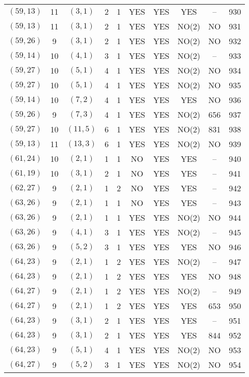 \begin{longtable}{|c|c|c|c|c|c|c|c|c|c|}
$(59, 13)$ & 11 & $(3, 1)$ & 2 & 1 & YES & YES & YES & -- & 930\\
$(59, 13)$ & 11 & $(3, 1)$ & 2 & 1 & YES & YES & NO(2) & NO & 931\\
$(59, 26)$ & 9 & $(3, 1)$ & 2 & 1 & YES & YES & NO(2) & NO & 932\\
$(59, 14)$ & 10 & $(4, 1)$ & 3 & 1 & YES & YES & NO(2) & -- & 933\\
$(59, 27)$ & 10 & $(5, 1)$ & 4 & 1 & YES & YES & NO(2) & NO & 934\\
$(59, 27)$ & 10 & $(5, 1)$ & 4 & 1 & YES & YES & NO(2) & NO & 935\\
$(59, 14)$ & 10 & $(7, 2)$ & 4 & 1 & YES & YES & YES & NO & 936\\
$(59, 26)$ & 9 & $(7, 3)$ & 4 & 1 & YES & YES & NO(2) & 656 & 937\\
$(59, 27)$ & 10 & $(11, 5)$ & 6 & 1 & YES & YES & NO(2) & 831 & 938\\
$(59, 13)$ & 11 & $(13, 3)$ & 6 & 1 & YES & YES & NO(2) & NO & 939\\
$(61, 24)$ & 10 & $(2, 1)$ & 1 & 1 & NO & YES & YES & -- & 940\\
$(61, 19)$ & 10 & $(3, 1)$ & 2 & 1 & NO & YES & YES & -- & 941\\
$(62, 27)$ & 9 & $(2, 1)$ & 1 & 2 & NO & YES & YES & -- & 942\\
$(63, 26)$ & 9 & $(2, 1)$ & 1 & 1 & NO & YES & YES & -- & 943\\
$(63, 26)$ & 9 & $(2, 1)$ & 1 & 1 & YES & YES & NO(2) & NO & 944\\
$(63, 26)$ & 9 & $(4, 1)$ & 3 & 1 & YES & YES & NO(2) & -- & 945\\
$(63, 26)$ & 9 & $(5, 2)$ & 3 & 1 & YES & YES & YES & NO & 946\\
$(64, 23)$ & 9 & $(2, 1)$ & 1 & 2 & YES & YES & NO(2) & -- & 947\\
$(64, 23)$ & 9 & $(2, 1)$ & 1 & 2 & YES & YES & YES & NO & 948\\
$(64, 27)$ & 9 & $(2, 1)$ & 1 & 2 & YES & YES & NO(2) & -- & 949\\
$(64, 27)$ & 9 & $(2, 1)$ & 1 & 2 & YES & YES & YES & 653 & 950\\
$(64, 23)$ & 9 & $(3, 1)$ & 2 & 1 & YES & YES & YES & -- & 951\\
$(64, 23)$ & 9 & $(3, 1)$ & 2 & 1 & YES & YES & YES & 844 & 952\\
$(64, 23)$ & 9 & $(5, 1)$ & 4 & 1 & YES & YES & NO(2) & NO & 953\\
$(64, 27)$ & 9 & $(5, 2)$ & 3 & 1 & YES & YES & NO(2) & NO & 954\\

\end{longtable}
